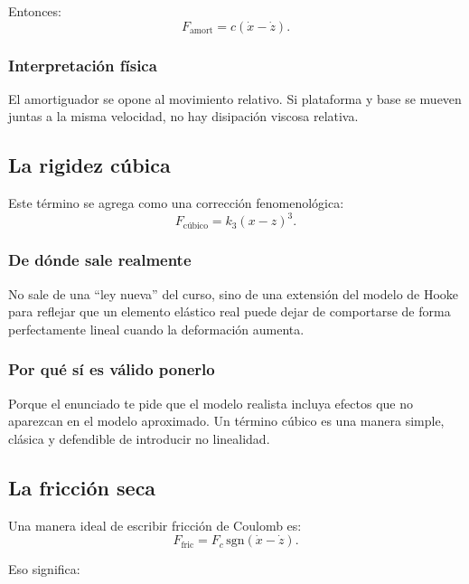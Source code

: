 \documentclass[11pt]{article}
\begin{document}
Entonces:
\begin{equation}
F_{\text{amort}} = c(\dot{x}-\dot{z}).
\label{eq:damper}
\end{equation}

\subsubsection{Interpretaci\'on f\'isica}

El amortiguador se opone al movimiento relativo. Si plataforma y base se mueven juntas a la misma velocidad, no hay disipaci\'on viscosa relativa.

\subsection{La rigidez c\'ubica}

Este t\'ermino se agrega como una correcci\'on fenomenol\'ogica:
\begin{equation}
F_{\text{c\'ubico}} = k_3(x-z)^3.
\label{eq:cubico}
\end{equation}

\subsubsection{De d\'onde sale realmente}

No sale de una ``ley nueva'' del curso, sino de una extensi\'on del modelo de Hooke para reflejar que un elemento el\'astico real puede dejar de comportarse de forma perfectamente lineal cuando la deformaci\'on aumenta.

\subsubsection{Por qu\'e s\'i es v\'alido ponerlo}

Porque el enunciado te pide que el modelo realista incluya efectos que no aparezcan en el modelo aproximado. Un t\'ermino c\'ubico es una manera simple, cl\'asica y defendible de introducir no linealidad.

\subsection{La fricci\'on seca}

Una manera ideal de escribir fricci\'on de Coulomb es:
\[
F_{\text{fric}} = F_c\,\mathrm{sgn}(\dot{x}-\dot{z}).
\]

Eso significa:
\end{document}
